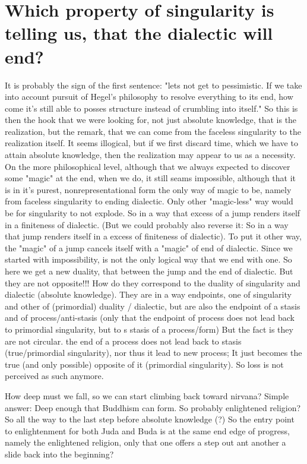 \documentclass[10pt]{book}
\begin{document}
\section{Which property of singularity is telling us, that the dialectic will end?}

It is probably the sign of the first sentence: "lets not get to pessimistic. If we take into account pursuit of Hegel's philosophy to resolve everything to its end, how come it's still able to posses structure instead of crumbling into itself." So this is then the hook that we were looking for, not just absolute knowledge, that is the realization, but the remark, that we can come from the faceless singularity to the realization itself. It seems illogical, but if we first discard time, which we have to attain absolute knowledge, then the realization may appear to us as a necessity. On the more philosophical level, although that we always expected to discover some "magic" at the end, when we do, it still seams impossible, although that it is in it's purest, nonrepresentational form the only way of magic to be, namely from faceless singularity to ending dialectic. Only other "magic-less" way would be for singularity to not explode. So in a way that excess of a jump renders itself in a finiteness of dialectic. (But we could probably also reverse it: So in a way that jump renders itself in a excess of finiteness of dialectic). To put it other way, the "magic" of a jump cancels itself with a "magic" of end of dialectic. Since we started with impossibility, is not the only logical way that we end with one. 
So here we get a new duality, that between the jump and the end of dialectic. But they are not opposite!!! How do they correspond to the duality of singularity and dialectic (absolute knowledge). They are in a way endpoints, one of singularity and other of (primordial) duality / dialectic, but are also the endpoint of a stasis and of process/anti-stasis (only that the endpoint of process does not lead back to primordial singularity, but to s stasis of a process/form) But the fact is they are not circular. the end of a process does not lead back to stasis (true/primordial singularity), nor thus it lead to new process; It just becomes the true (and only possible) opposite of it (primordial singularity). So loss is not perceived as such anymore. 

How deep must we fall, so we can start climbing back toward nirvana?
Simple answer: Deep enough that Buddhism can form. So probably enlightened religion? So all the way to the last step before absolute knowledge (?) So the entry point to enlightenment for both Juda and Buda is at the same end edge of progress, namely the enlightened religion, only that one offers a step out ant another a slide back into the beginning?
\end{document}
